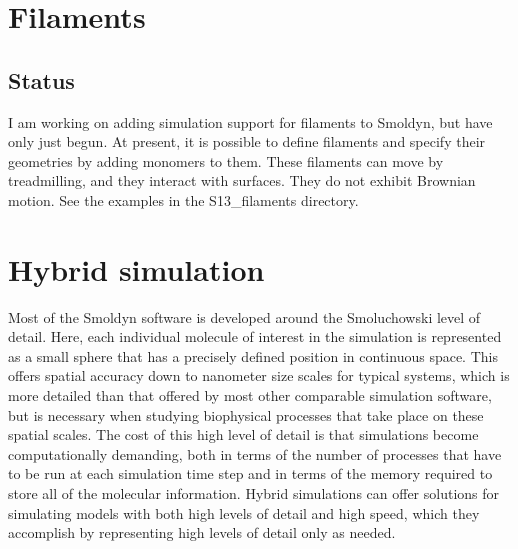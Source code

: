 \documentclass {scrbook}
\begin{document}
\chapter{Filaments}

\section{Status}

I am working on adding simulation support for filaments to Smoldyn, but have only just begun. At present, it is possible to define filaments and specify their geometries by adding monomers to them. These filaments can move by treadmilling, and they interact with surfaces. They do not exhibit Brownian motion. See the examples in the S13\_filaments directory.


\chapter{Hybrid simulation}

Most of the Smoldyn software is developed around the Smoluchowski level of detail. Here, each individual molecule of interest in the simulation is represented as a small sphere that has a precisely defined position in continuous space. This offers spatial accuracy down to nanometer size scales for typical systems, which is more detailed than that offered by most other comparable simulation software, but is necessary when studying biophysical processes that take place on these spatial scales. The cost of this high level of detail is that simulations become computationally demanding, both in terms of the number of processes that have to be run at each simulation time step and in terms of the memory required to store all of the molecular information. Hybrid simulations can offer solutions for simulating models with both high levels of detail and high speed, which they accomplish by representing high levels of detail only as needed.
\end{document}
